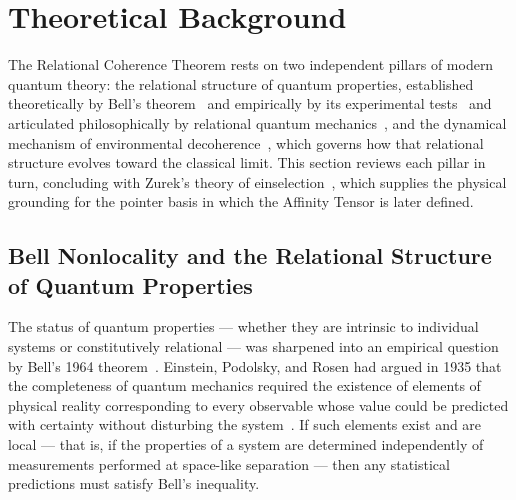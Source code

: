
\section{\label{sec:background}Theoretical Background}

The Relational Coherence Theorem rests on two independent pillars of
modern quantum theory: the relational structure of quantum properties,
established theoretically by Bell's theorem~\cite{Bell1964} and
empirically by its experimental
tests~\cite{Aspect1982,Zeilinger2022Nobel} and articulated
philosophically by relational quantum
mechanics~\cite{Rovelli1996,Rovelli2021}, and the dynamical mechanism
of environmental decoherence~\cite{Zurek2003}, which governs how that
relational structure evolves toward the classical limit.
This section reviews each pillar in turn, concluding with Zurek's
theory of einselection~\cite{Zurek2003}, which supplies the physical
grounding for the pointer basis in which the Affinity Tensor is later
defined.


\subsection{\label{sec:bell}Bell Nonlocality and the Relational Structure
            of Quantum Properties}

The status of quantum properties --- whether they are intrinsic to
individual systems or constitutively relational --- was sharpened into
an empirical question by Bell's 1964 theorem~\cite{Bell1964}.
Einstein, Podolsky, and Rosen had argued in 1935 that the completeness
of quantum mechanics required the existence of elements of physical
reality corresponding to every observable whose value could be predicted
with certainty without disturbing the system~\cite{Einstein1935EPR}.
If such elements exist and are local --- that is, if the properties of a
system are determined independently of measurements performed at
space-like separation --- then any statistical predictions must satisfy
Bell's inequality.

